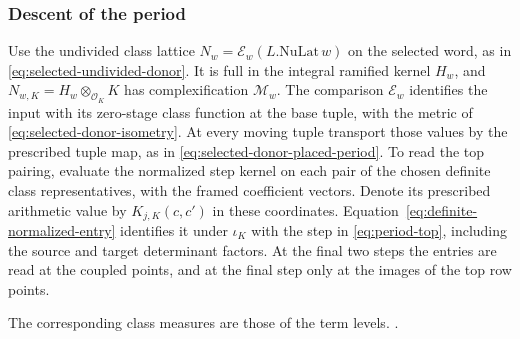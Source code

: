 \subsubsection{Descent of the period}
Use the undivided class lattice \(N_w=\mathcal E_w(L.\mathrm{NuLat}\,w)\)
on the selected word, as in \eqref{eq:selected-undivided-donor}.
It is full in the integral ramified kernel \(H_w\), and
\(N_{w,K}=H_w\otimes_{\mathcal O_K}K\) has complexification
\(\mathcal M_w\). The comparison \(\mathcal E_w\) identifies the
input with its zero-stage class function at the base tuple,
with the metric of \eqref{eq:selected-donor-isometry}. At every
moving tuple transport those values by the prescribed tuple map, as in
\eqref{eq:selected-donor-placed-period}. To read the top
pairing, evaluate the normalized
step kernel on each pair of the chosen definite class
representatives, with the framed coefficient vectors. Denote its
prescribed arithmetic value by \(K_{j,K}(c,c')\) in these
coordinates. Equation~\eqref{eq:definite-normalized-entry}
identifies it under \(\iota_K\) with the step in
\eqref{eq:period-top}, including the source and target
determinant factors. At the final two steps the entries
are read at the coupled points, and at the final step
only at the images of the top row points.

The corresponding class measures are those of the term levels.
.

